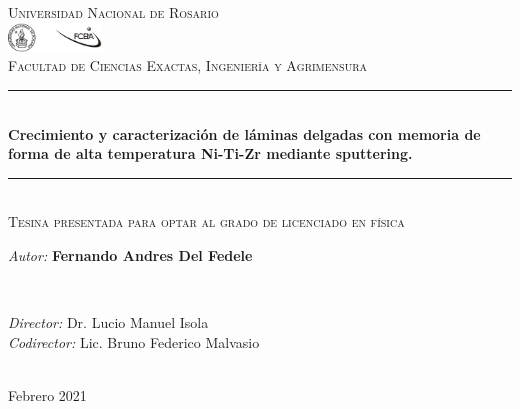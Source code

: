 \documentclass[12pt]{article}
\title{\thesistitle}
\author{\thesisauthorfirst\space\thesisauthorsecond}
\date{\thesisdate}
\def\thesistitle{Crecimiento y caracterización de láminas delgadas con memoria de
forma de alta temperatura Ni-Ti-Zr mediante sputtering.}
\def\thesisauthorfirst{\textbf{Fernando Andres Del Fedele}}
\def\thesissupervisorfirst{Dr. Lucio Manuel Isola}
\def\thesissupervisorsecond{Lic. Bruno Federico Malvasio}
\def\thesisdate{Febrero 2021}
\theoremstyle{definition}
\theoremstyle{remark}
\begin{document}
\begin{titlepage}
	\thispagestyle{empty}
	\newcommand{\HRule}{\rule{\linewidth}{0.5mm}}
	\center
	\textsc{\Large Universidad Nacional de Rosario}\\[.7cm]
	\includegraphics[width=25mm]{img/fceia.jpg}\\[.5cm]
	\textsc{Facultad de Ciencias Exactas, Ingeniería y Agrimensura}\\[0.5cm]
	
	\HRule \\[0.4cm]
	{ \huge \bfseries \thesistitle}\\[0.1cm]
	\HRule \\[.5cm]
	\textsc{\large Tesina presentada para optar al grado de licenciado en física}\\[.5cm]
	
	\begin{minipage}{0.6\textwidth}
	\large
	\emph{Autor:}	\thesisauthorfirst
	\end{minipage}
	\\[.6cm]
	\begin{minipage}{0.6\textwidth}
	\emph{Director:} 	\thesissupervisorfirst \\[.2cm]
	\emph{Codirector:} 	\thesissupervisorsecond
	\end{minipage}
	\\[4cm]
	\vfill
	{\large \thesisdate}\\
	\clearpage
\end{titlepage}
\end{document}
